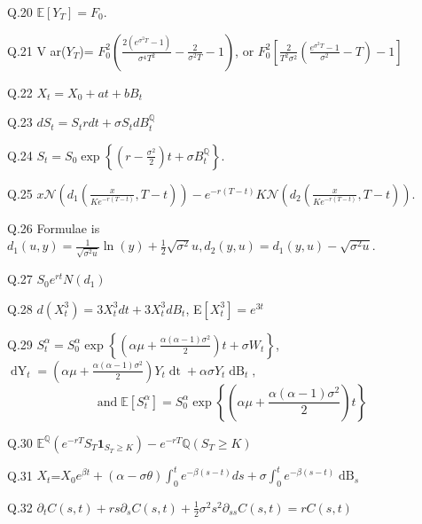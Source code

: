 \documentclass{article}
\newcommand{\tmmathbf}[1]{\ensuremath{\boldsymbol{#1}}}
\newcommand{\tmop}[1]{\ensuremath{\operatorname{#1}}}
\begin{document}
Q.20 $\mathbb{E} [Y_T] = F_0$.

Q.21  V ar($Y_T$)= $F_0^2 \left( \frac{2 (e^{\sigma^2 T} - 1)}{\sigma^4 T^2} -
\frac{2}{\sigma^2 T} - 1 \right)$, or $F_0^2 \left[ \frac{2}{T^2 \sigma^2}
\left( \frac{e^{\sigma^2 T} - 1}{\sigma^2} - T \right) - 1 \right]$

Q.22 $X_t = X_0 + a t + b B_t$

Q.23 $d S_t = S_t r d t + \sigma S_t d B_t^{\mathbb{Q}} $

Q.24 $S_t = S_0 \exp \left\{ \left( r - \frac{\sigma^2}{2} \right) t + \sigma
B_t^{\mathbb{Q}} \right\}$.

Q.25 $x \mathcal{N} \left( d_1 \left( \frac{x}{K e^{- r (T - t)}}, T - t
\right) \right) - e^{- r (T - t)} K  \mathcal{N} \left( d_2 \left( \frac{x}{K
e^{- r (T - t) }}, T - t \right) \right)$.

Q.26 Formulae is $d_1 (u, y) = \frac{1}{\sqrt{\sigma^2 u}}
\ln (y) + \frac{1}{2} \sqrt{\sigma^2} u, d_2 (y, u) = d_1 (y, u) -
\sqrt{\sigma^2 u}$.

Q.27 $S_0 e^{r t} N (d_1)$

Q.28 $d (X_t^3) = 3 X_t^3 d t + 3 X_{t }^3 d B_t$,  E$[X_t^3] = e^{3 t}$

Q.29 $S_t^{\alpha} = S_0^{\alpha} \exp \left\{ \left( \alpha \mu +
\frac{\alpha (\alpha - 1) \sigma^2}{2} \right) t + \sigma W_t \right\}$,
$\tmop{dY}_t = \left( \alpha \mu + \frac{\alpha (\alpha - 1) \sigma^2}{2}
\right) Y_t \tmop{dt} + \alpha \sigma Y_t \tmop{dB}_t,$
\[ \tmop{and} \mathbb{E} [S_t^{\alpha}] = S_0^{\alpha} \exp \left\{ \left(
   \alpha \mu + \frac{\alpha (\alpha - 1) \sigma^2}{2} \right) t \right\} \]
   
Q.30 $\mathbb{E}^{\mathbb{Q}} (e^{- r T} S_T \tmmathbf{1}_{S_T \geq K}) - e^{-
r T} \mathbb{Q} (S_T \geq K)$

Q.31 $X_t$=$X_0 e^{\beta t} + (\alpha - \sigma \theta) \int_0^t e^{- \beta (s
- t)} d s + \sigma \int_0^t e^{- \beta (s - t)} \tmop{dB}_s $

Q.32 $\partial_t C (s, t) + r s \partial_s C (s, t) + \frac{1}{2} \sigma^2 s^2
\partial_{s s} C (s, t) = r C (s, t)$

\

\

\

\

\

\

$\mathbb{}$

\

\

\

\
\end{document}
